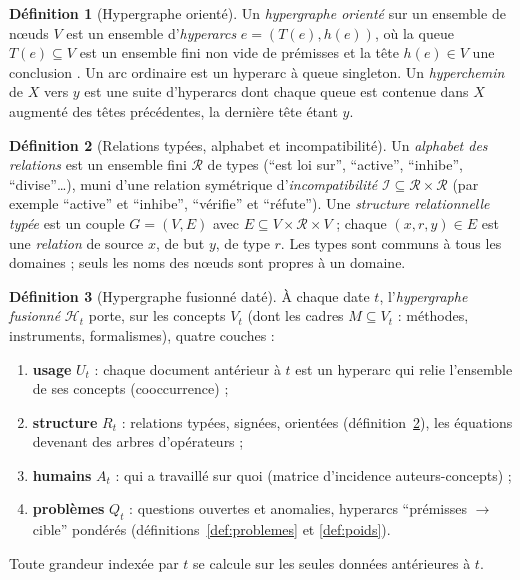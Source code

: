 \documentclass[11pt,a4paper]{article}
\theoremstyle{definition}
\newtheorem{definition}{Définition}[section]
\theoremstyle{plain}
\newcommand{\R}{\mathcal{R}}
\newcommand{\Inc}{\mathcal{I}}
\begin{document}
\begin{definition}[Hypergraphe orienté]
\label{def:hypergraphe}
Un \emph{hypergraphe orienté} sur un ensemble de nœuds $V$ est un ensemble d'\emph{hyperarcs}
$e=(T(e),h(e))$, où la queue $T(e)\subseteq V$ est un ensemble fini non vide de prémisses et la tête
$h(e)\in V$ une conclusion \cite{gallo1993}. Un arc ordinaire est un hyperarc à queue singleton.
Un \emph{hyperchemin} de $X$ vers $y$ est une suite d'hyperarcs dont chaque queue est contenue dans
$X$ augmenté des têtes précédentes, la dernière tête étant $y$.
\end{definition}

\begin{definition}[Relations typées, alphabet et incompatibilité]
\label{def:alphabet}
Un \emph{alphabet des relations} est un ensemble fini $\R$ de types (\enquote{est loi sur},
\enquote{active}, \enquote{inhibe}, \enquote{divise}\dots), muni d'une relation symétrique
d'\emph{incompatibilité} $\Inc\subseteq\R\times\R$ (par exemple \enquote{active} et
\enquote{inhibe}, \enquote{vérifie} et \enquote{réfute}). Une \emph{structure relationnelle typée}
est un couple $G=(V,E)$ avec $E\subseteq V\times\R\times V$ ; chaque $(x,r,y)\in E$ est une
\emph{relation} de source $x$, de but $y$, de type $r$. Les types sont communs à tous les
domaines \cite[partie~2]{fable} ; seuls les noms des nœuds sont propres à un domaine.
\end{definition}

\begin{definition}[Hypergraphe fusionné daté]
\label{def:fusionne}
À chaque date $t$, l'\emph{hypergraphe fusionné} $\mathcal{H}_t$ porte, sur les concepts $V_t$
(dont les cadres $M\subseteq V_t$ : méthodes, instruments, formalismes), quatre couches :
\begin{enumerate}
\item \textbf{usage} $U_t$ : chaque document antérieur à $t$ est un hyperarc qui relie l'ensemble de
ses concepts (cooccurrence) ;
\item \textbf{structure} $R_t$ : relations typées, signées, orientées (définition~\ref{def:alphabet}),
les équations devenant des arbres d'opérateurs \cite[partie~2]{fable} ;
\item \textbf{humains} $A_t$ : qui a travaillé sur quoi (matrice d'incidence auteurs-concepts) ;
\item \textbf{problèmes} $Q_t$ : questions ouvertes et anomalies, hyperarcs \enquote{prémisses
$\to$ cible} pondérés (définitions~\ref{def:problemes} et \ref{def:poids}).
\end{enumerate}
Toute grandeur indexée par $t$ se calcule sur les seules données antérieures à $t$.
\end{definition}
\end{document}

